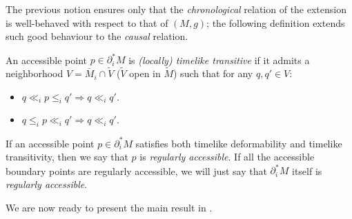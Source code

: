 The previous notion ensures only that the {\em chronological} relation of the extension is well-behaved with respect to that of $(M,g)$; the following definition extends such good behaviour to the {\em causal} relation.

\begin{definition}\label{def:transitive}
  An accessible point $p\in \partial_i^* M$ is {\em (locally) timelike transitive} if it admits a neighborhood $V=\overline{M}_i\cap \tilde{V}$ ($\tilde{V}$ open in $\tilde{M}$) such that for any $q,q'\in V$:
  \begin{itemize}
  \item $q\ll_i p \leq_i q' \Rightarrow q\ll_i q'$.

  \item $q\leq_i p \ll_i q'\Rightarrow q\ll_i q'$.
  \end{itemize}
\end{definition}
 If an accessible point $p\in \partial_i^* M$ satisfies both timelike deformability and timelike transitivity, then we say that $p$ is {\it regularly accessible}. If all the accessible boundary points are regularly accessible, we will just say that $\partial_i^* M$ itself is {\it regularly accessible}.

\smallskip

We are now ready to present the main result in \cite[Section 4]{Floresfinaldefinitioncausal2011}.

